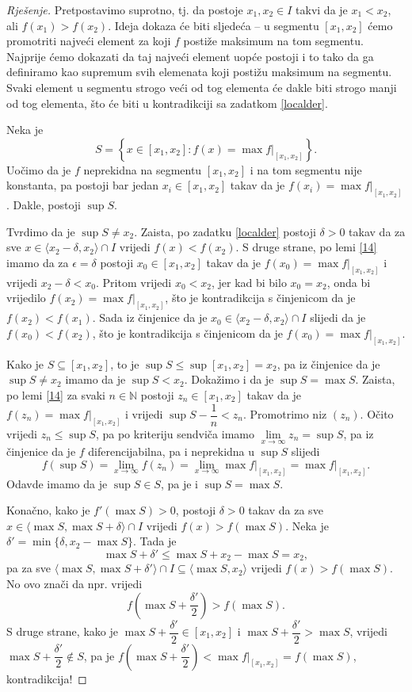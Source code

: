 \begin{proof}[Rješenje]
Pretpostavimo suprotno, tj. da postoje $x_1, x_2\in I$ takvi da je $x_1<x_2$, ali $f(x_1)>f(x_2)$. Ideja dokaza će biti sljedeća -- u segmentu $[x_1, x_2]$ ćemo promotriti najveći element za koji $f$ postiže maksimum na tom segmentu. Najprije ćemo dokazati da taj najveći element uopće postoji i to tako da ga definiramo kao supremum svih elemenata koji postižu maksimum na segmentu. Svaki element u segmentu strogo veći od tog elementa će dakle biti strogo manji od tog elementa, što će biti u kontradikciji sa zadatkom \ref{localder}.

Neka je 
$$S=\left\{x\in [x_1, x_2] : f(x)=\max{f|_{[x_1, x_2]}}\right\}.$$ 
Uočimo da je $f$ neprekidna na segmentu $[x_1, x_2]$ i na tom segmentu nije konstanta, pa postoji bar jedan $x_i\in [x_1, x_2]$ takav da je $f(x_i)=\max{f|_{[x_1, x_2]}}$. Dakle, postoji $\sup{S}$.

Tvrdimo da je $\sup{S}\neq x_2$. Zaista, po zadatku \ref{localder} postoji $\delta>0$ takav da za sve $x\in \langle x_2-\delta, x_2\rangle\cap I$ vrijedi $f(x)<f(x_2)$. S druge strane, po lemi \ref{14} imamo da za $\epsilon=\delta$ postoji $x_0\in [x_1, x_2]$ takav da je $f(x_0)=\max{f|_{[x_1, x_2]}}$ i vrijedi $x_2-\delta<x_0$. Pritom vrijedi $x_0<x_2$, jer kad bi bilo $x_0=x_2$, onda bi vrijedilo $f(x_2)=\max{f|_{[x_1, x_2]}}$, što je kontradikcija s činjenicom da je $f(x_2)<f(x_1)$. Sada iz činjenice da je $x_0\in \langle x_2-\delta, x_2\rangle\cap I$ slijedi da je $f(x_0)<f(x_2)$, što je kontradikcija s činjenicom da je $f(x_0)=\max{f|_{[x_1, x_2]}}$.

Kako je $S\subseteq [x_1, x_2]$, to je $\sup{S}\leq \sup{[x_1, x_2]}=x_2$, pa iz činjenice da je $\sup{S}\neq x_2$ imamo da je $\sup{S}<x_2$. Dokažimo i da je
$\sup{S}=\max{S}.$
Zaista, po lemi \ref{14} za svaki $n\in \mathbb{N}$ postoji $z_n\in [x_1, x_2]$ takav da je $f(z_n)=\max{f|_{[x_1, x_2]}}$ i vrijedi $\sup{S}-\dfrac{1}{n}<z_n$. Promotrimo niz $(z_n)$. Očito vrijedi $z_n\leq \sup{S}$, pa po kriteriju sendviča imamo $\lim\limits_{x\to\infty}{z_n}=\sup{S}$, pa iz činjenice da je $f$ diferencijabilna, pa i neprekidna u $\sup{S}$ slijedi
$$f(\sup{S})=\lim\limits_{x\to\infty}{f(z_n)}=\lim\limits_{x\to\infty}{\max{f|_{[x_1, x_2]}}}=\max{f|_{[x_1, x_2]}}.$$
Odavde imamo da je $\sup{S}\in S$, pa je i $\sup{S}=\max{S}$.

Konačno, kako je $f'(\max{S})>0$, postoji $\delta>0$ takav da za sve $x\in \langle \max{S}, \max{S}+\delta\rangle\cap I$ vrijedi $f(x)>f(\max{S})$. Neka je $\delta'=\min\{\delta, x_2-\max{S}\}$. Tada je 
$$\max{S}+\delta'\leq \max{S}+x_2-\max{S}=x_2,$$
pa za sve $\langle \max{S}, \max{S}+\delta'\rangle\cap I\subseteq \langle \max{S}, x_2\rangle$ vrijedi $f(x)>f(\max{S})$. No ovo znači da npr. vrijedi $$f\left(\max{S}+\dfrac{\delta'}{2}\right)>f(\max{S}).$$ S druge strane, kako je $\max{S}+\dfrac{\delta'}{2}\in [x_1, x_2]$ i $\max{S}+\dfrac{\delta'}{2}>\max{S}$, vrijedi $\max{S}+\dfrac{\delta'}{2}\notin S$,
pa je $f\left(\max{S}+\dfrac{\delta'}{2}\right)<\max{f|_{[x_1, x_2]}}=f(\max{S})$, kontradikcija!
\end{proof}
